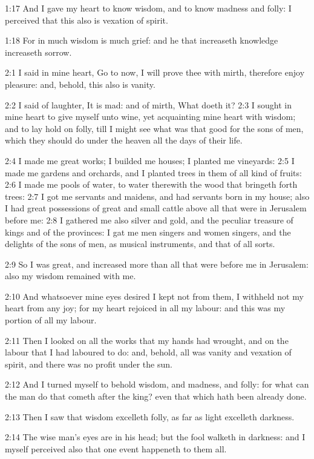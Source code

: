 1:17 And I gave my heart to know wisdom, and to know madness and folly: I perceived that this also is vexation of spirit.

1:18 For in much wisdom is much grief: and he that increaseth knowledge increaseth sorrow.

2:1 I said in mine heart, Go to now, I will prove thee with mirth, therefore enjoy pleasure: and, behold, this also is vanity.

2:2 I said of laughter, It is mad: and of mirth, What doeth it?  2:3 I sought in mine heart to give myself unto wine, yet acquainting mine heart with wisdom; and to lay hold on folly, till I might see what was that good for the sons of men, which they should do under the heaven all the days of their life.

2:4 I made me great works; I builded me houses; I planted me vineyards: 2:5 I made me gardens and orchards, and I planted trees in them of all kind of fruits: 2:6 I made me pools of water, to water therewith the wood that bringeth forth trees: 2:7 I got me servants and maidens, and had servants born in my house; also I had great possessions of great and small cattle above all that were in Jerusalem before me: 2:8 I gathered me also silver and gold, and the peculiar treasure of kings and of the provinces: I gat me men singers and women singers, and the delights of the sons of men, as musical instruments, and that of all sorts.

2:9 So I was great, and increased more than all that were before me in Jerusalem: also my wisdom remained with me.

2:10 And whatsoever mine eyes desired I kept not from them, I withheld not my heart from any joy; for my heart rejoiced in all my labour: and this was my portion of all my labour.

2:11 Then I looked on all the works that my hands had wrought, and on the labour that I had laboured to do: and, behold, all was vanity and vexation of spirit, and there was no profit under the sun.

2:12 And I turned myself to behold wisdom, and madness, and folly: for what can the man do that cometh after the king? even that which hath been already done.

2:13 Then I saw that wisdom excelleth folly, as far as light excelleth darkness.

2:14 The wise man's eyes are in his head; but the fool walketh in darkness: and I myself perceived also that one event happeneth to them all.

